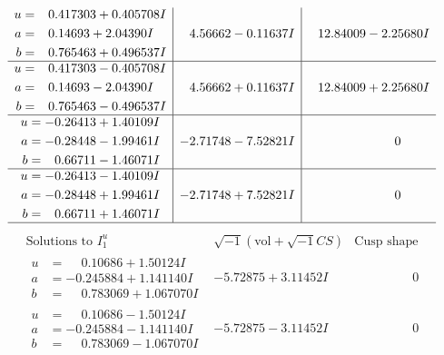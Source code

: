 \documentclass[1p]{elsarticle_modified}
\theoremstyle{definition}
\newcommand{\I}{\sqrt{-1}}
\begin{document}
$$\begin{array}{c|c|c}
\begin{aligned}
u &= \phantom{-}0.417303 + 0.405708 I \\
a &= \phantom{-}0.14693 + 2.04390 I \\
b &= \phantom{-}0.765463 + 0.496537 I\end{aligned}
 & \phantom{-}4.56662 - 0.11637 I & \phantom{-}12.84009 - 2.25680 I \\ \hline\begin{aligned}
u &= \phantom{-}0.417303 - 0.405708 I \\
a &= \phantom{-}0.14693 - 2.04390 I \\
b &= \phantom{-}0.765463 - 0.496537 I\end{aligned}
 & \phantom{-}4.56662 + 0.11637 I & \phantom{-}12.84009 + 2.25680 I \\ \hline\begin{aligned}
u &= -0.26413 + 1.40109 I \\
a &= -0.28448 - 1.99461 I \\
b &= \phantom{-}0.66711 - 1.46071 I\end{aligned}
 & -2.71748 - 7.52821 I & \phantom{-0.000000 } 0 \\ \hline\begin{aligned}
u &= -0.26413 - 1.40109 I \\
a &= -0.28448 + 1.99461 I \\
b &= \phantom{-}0.66711 + 1.46071 I\end{aligned}
 & -2.71748 + 7.52821 I & \phantom{-0.000000 } 0\\
 \hline 
 \end{array}$$\newpage$$\begin{array}{c|c|c}  
\text{Solutions to }I^u_{1}& \I (\text{vol} + \sqrt{-1}CS) & \text{Cusp shape}\\
 \hline 
\begin{aligned}
u &= \phantom{-}0.10686 + 1.50124 I \\
a &= -0.245884 + 1.141140 I \\
b &= \phantom{-}0.783069 + 1.067070 I\end{aligned}
 & -5.72875 + 3.11452 I & \phantom{-0.000000 } 0 \\ \hline\begin{aligned}
u &= \phantom{-}0.10686 - 1.50124 I \\
a &= -0.245884 - 1.141140 I \\
b &= \phantom{-}0.783069 - 1.067070 I\end{aligned}
 & -5.72875 - 3.11452 I & \phantom{-0.000000 } 0 \\ \hline\begin{aligned}

\end{aligned}
\end{array}$$
\end{document}
